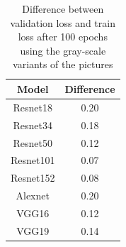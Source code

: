 \begin{table}[h]
\centering
        \begin{tabular}{ c c  }
                 Model&Difference\\
                 \hline
                   Resnet18&0.20\\
Resnet34&0.18\\
Resnet50&0.12\\
Resnet101&0.07\\
Resnet152&0.08\\
Alexnet&0.20\\
VGG16&0.12\\
VGG19&0.14\\
                    \end{tabular}
                    \caption{Difference between validation loss and train loss after 100 epochs using the gray-scale variants of the pictures}                   
                     \label{tab:difference_val_tra_loss_2}
     \end{table} 
     
